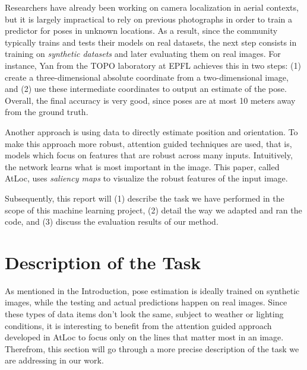 \documentclass[10pt,conference,compsocconf]{IEEEtran}
\begin{document}
Researchers have already been working on camera localization in aerial contexts, but it is largely impractical to rely on previous photographs in order to train a predictor for poses in unknown locations. As a result, since the community typically trains and tests their models on real datasets, the next step consists in training  on \emph{synthetic datasets} and later evaluating them on real images. For instance, Yan \cite{yan2020oneshot} from the TOPO laboratory at EPFL achieves this in two steps: (1) create a three-dimensional absolute coordinate from a two-dimensional image, and (2) use these intermediate coordinates to output an estimate of the pose. Overall, the final accuracy is very good, since poses are at most 10 meters away from the ground truth.

Another approach is using data to directly estimate position and orientation. To make this approach more robust, attention guided techniques \cite{wang2019atloc} are used, that is, models which focus on features that are robust across many inputs. Intuitively, the network learns what is most important in the image. This paper, called AtLoc, uses \emph{saliency maps} to visualize the robust features of the input image.

Subsequently, this report will (1) describe the task we have performed in the scope of this machine learning project, (2) detail the way we adapted and ran the code, and (3) discuss the evaluation results of our method.



\section{Description of the Task}

As mentioned in the Introduction, pose estimation is ideally trained on synthetic images, while the testing and actual predictions happen on real images. Since these types of data items don't look the same, subject to weather or lighting conditions, it is interesting to benefit from the attention guided approach developed in AtLoc \cite{wang2019atloc} to focus only on the lines that matter most in an image. Therefrom, this section will go through a more precise description of the task we are addressing in our work.
\end{document}
